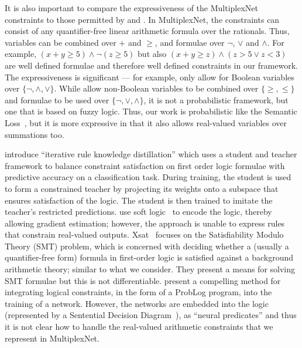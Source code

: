 \documentclass[letterpaper]{article} %
\begin{document}
It is also important to compare the expressiveness of the MultiplexNet constraints to those permitted by \citet{fischer2018dl2} and \citet{xu2017semantic}. 
In MultiplexNet, the constraints can consist of any quantifier-free linear arithmetic formula over the rationals.
Thus, variables can be combined over $+$ and $\geq$, and formulae over $\neg$, $\lor$ and $\land$. 
For example, $(x + y \geq 5) \land \neg (z \geq 5)$ but also $(x + y \geq z) \land (z > 5 \lor z < 3)$ are well defined formulae and therefore well defined constraints in our framework.
The expressiveness is significant --- for example, \citet{xu2017semantic} only allow for Boolean variables over $\{\neg, \land, \lor \}$.
While \citet{fischer2018dl2} allow non-Boolean variables to be combined over $\{ \geq, \leq \}$ and formulae to be used over $\{ \neg, \lor, \land \}$, it is not a probabilistic framework, but  one that is based on fuzzy logic. 
Thus, our work is probabilistic like the Semantic Loss~\citep{xu2017semantic}, but it is more expressive in that it also allows real-valued variables over summations too. 

\citet{hu2016harnessing} introduce ``iterative rule knowledge distillation'' which uses a student and teacher framework to balance constraint satisfaction on first order logic formulae with predictive accuracy on a classification task. 
During training, the student is used to form a constrained teacher by projecting its weights onto a subspace that ensures satisfaction of the logic.
The student is then trained to imitate the teacher's restricted predictions. 
\citet{hu2016harnessing} use soft logic~\citep{bach2017Hinge} to encode the logic, thereby allowing gradient estimation; however, the approach is unable to express rules that constrain real-valued outputs. 
Xsat~\citep{Fu2016XSat} focuses on the Satisfiability Modulo Theory (SMT) problem, which is concerned with deciding whether a (usually a quantifier-free form) formula in first-order logic is satisfied against a background arithmetic theory; similar to what we consider.
They present a means for solving SMT formulae but this is not differentiable.
\citet{manhaeve2018deepproblog} present a compelling method for integrating logical constraints, in the form of a ProbLog program, into the training of a network.
However, the networks are embedded into the logic (represented by a Sentential Decision Diagram~\citep{darwiche2011sdd}), as ``neural predicates'' and thus it is not clear how to handle the real-valued arithmetic constraints that we represent in MultiplexNet.
\end{document}
